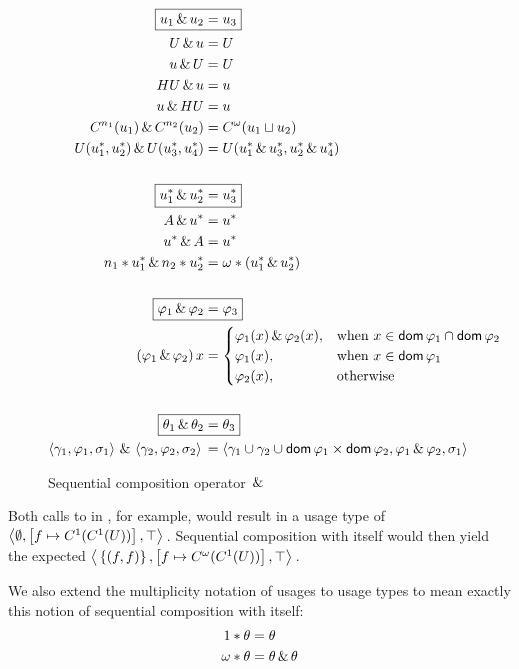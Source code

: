 \begin{figure}
\begin{alignat*}{1}
  \Aboxed{u_1 \both u_2 &= u_3} \\
  U \both u  &= U \\
  u \both U  &= U \\
  HU \both u &= u \\
  u \both HU &= u \\
  C^{n_1}(u_1) \both C^{n_2}(u_2) &= C^{\omega}(u_1 \llub u_2) \\
  U(u^*_1, u^*_2) \both U(u^*_3, u^*_4) &= U(u^*_1 \both u^*_3, u^*_2 \both u^*_4) \\
  &\\
  \Aboxed{u^*_1 \both u^*_2 &= u^*_3} \\
  A \both u^* &= u^* \\
  u^* \both A &= u^* \\ 
  n_1*u^*_1 \both n_2*u^*_2 &= \omega * (u^*_1 \both u^*_2) \\
  &\\
  \Aboxed{\varphi_1 \both \varphi_2 &= \varphi_3} \\
  (\varphi_1 \both \varphi_2)\,x &= \begin{cases}
    \varphi_1(x) \both \varphi_2(x),&\text{when } x \in \dom{\varphi_1} \cap \dom{\varphi_2} \\
    \varphi_1(x),&\text{when } x \in \dom{\varphi_1} \\
    \varphi_2(x),&\text{otherwise}
  \end{cases} \\
  &\\
  \Aboxed{\theta_1 \both \theta_2 &= \theta_3} \\
  \lTriple{\gamma_1}{\varphi_1}{\sigma_1} \both \lTriple{\gamma_2}{\varphi_2}{\sigma_2} &= \lTriple{\gamma_1 \cup \gamma_2 \cup \dom{\varphi_1} \times \dom{\varphi_2}}{\varphi_1 \both \varphi_2}{\sigma_1} \\
\end{alignat*}
\caption{Sequential composition operator $\,\&\,$}
\label{fig:both}
\end{figure}

Both calls to  in , for example, would result in a usage type of $\left\langle{}\emptyset,\left[f\mapsto C^1(C^1(U))\right],\top\right\rangle{}$. 
Sequential composition with itself would then yield the expected $\left\langle{}\left\{(f,f)\right\},\left[f\mapsto C^\omega(C^1(U))\right],\top\right\rangle{}$.

We also extend the multiplicity notation of usages to usage types to mean exactly this notion of sequential composition with itself:
\begin{alignat*}{1}
  1 * \theta &= \theta \\
  \omega * \theta &= \theta \,\&\, \theta
\end{alignat*}

